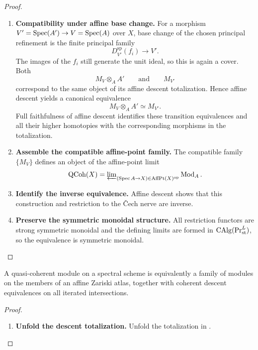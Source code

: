 \begin{proof}
\begin{enumerate}[label=\textup{(\arabic*)}]
    \item \textbf{Compatibility under affine base change.}
    For a morphism \(V'=\operatorname{Spec}(A')\to V=\operatorname{Spec}(A)\) over \(X\), base change of
    the chosen principal refinement is the finite principal family
    \[
        D_{V'}^{\mathrm{sp}}(f_i)
        \longrightarrow
        V'.
    \]
    The images of the \(f_i\) still generate the unit ideal, so this is again
    a cover. Both
    \[
        M_V\otimes_AA'
        \qquad\text{and}\qquad
        M_{V'}
    \]
    correspond to the same object of its affine descent totalization. Hence
    affine descent yields a canonical equivalence
    \[
        M_V\otimes_AA'\simeq M_{V'}.
    \]
    Full faithfulness of affine descent identifies these transition
    equivalences and all their higher homotopies with the corresponding
    morphisms in the totalization.

    \item \textbf{Assemble the compatible affine-point family.}
    The compatible family \(\{M_V\}\) defines an object of the affine-point
    limit
    \[
        \operatorname{QCoh}(X)
        =
        \varprojlim\nolimits_{(\operatorname{Spec} A\to X)\in\operatorname{AffPt}(X)^{\mathrm{op}}}\operatorname{Mod}_A.
    \]

    \item \textbf{Identify the inverse equivalence.}
    Affine descent shows that this construction and restriction to the \v{C}ech
    nerve are inverse.

    \item \textbf{Preserve the symmetric monoidal structure.}
    All restriction functors are strong symmetric
    monoidal and the defining limits are formed in
    \(\operatorname{CAlg}(\operatorname{Pr}^L_{\mathrm{st}})\), so the equivalence is symmetric
    monoidal.
\end{enumerate}
\end{proof}

\begin{corollary}
\label{cor:qcoh-zariski-locality}
A quasi-coherent module on a spectral scheme is equivalently a family of
modules on the members of an affine Zariski atlas, together with coherent
descent equivalences on all iterated intersections.
\end{corollary}

\begin{proof}
\leavevmode
\begin{enumerate}[label=\textup{(\arabic*)}]
    \item \textbf{Unfold the descent totalization.}
    Unfold the totalization in .
\end{enumerate}
\end{proof}

